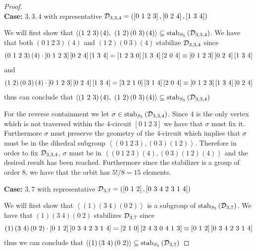\begin{proof}
  \label{pf:pcd_stab}
\ \\
\vspace{2ex}
\noindent
{\bf Case:} $3,3,4$ with representative $\operatorname{\mathcal{D}}_{3,3,4} = \left(\left[0\ 1\ 2\ 3   \right], \left[0\ 2\ 4 \right], \left[ 1\ 3\ 4 \right]\right)$ 
\vspace{2ex}

\noindent
We will first show that $\left<\left(1\ 2\ 3 \right)(4),\  \left(1\ 2\right)\left(0\ 3 \right)\left(4\right)\right> \subseteq \stab{S_5}{ \pcd_{3,3,4} }$. We have that both $ \left( 0\ 1\ 2\ 3 \right)\left(4\right)$ and $\left(1\ 2\right)\left(0\ 3\right)\left(4\right)$ stabilize $\operatorname{\mathcal{D}}_{3,3,4}$ since
\[ 
\acts{ \left( 0\ 1\ 2\ 3 \right)\left(4\right) }{\left[0\ 1\ 2\ 3 \right]  \left[0\ 2\ 4 \right] \left[ 1\ 3\ 4 \right]}  = \left[1\ 2\ 3\ 0 \right]\left[1\ 3\ 4 \right]\left[2\ 0\ 4 \right] \equiv \left[0\ 1\ 2\ 3 \right] \left[0\ 2\ 4\right] \left[ 1\ 3\ 4\right] 
\] and 
\[
\acts{\left(1\ 2\right)\left(0\ 3\right)\left(4\right)}{\left[0\ 1\ 2\ 3\right]\left[0\ 2\ 4\right]\left[1\ 3\ 4\right]}  = \left[3\ 2\ 1\ 0 \right]\left[3\ 1\ 4 \right]\left[2\ 0\ 4\right] \equiv \left[0\ 1\ 2\ 3 \right]\left[1\ 3\ 4 \right]\left[0\ 2\ 4 \right]
\] thus can conclude that $\left<\left(1\ 2\ 3 \right)(4),\  \left(1\ 2\right)\left(0\ 3 \right)\left(4\right)\right> \subseteq \stab{S_5}{ \pcd_{3,3,4} }$

For the reverse containment we let $\sigma \in \operatorname{\mathrm{stab}}_{S_5}\left(\operatorname{\mathcal{D}}_{3,3,4} \right)$. Since $4$ is the only vertex which is not traversed within the $4$-circuit $\left[0\ 1\ 2\ 3\right]$ we have that $\sigma$ must fix it. Furthermore $\sigma$ must preserve the geometry of the $4$-circuit which implies that $\sigma$ must be in the dihedral subgroup $\left< \left(0\ 1\ 2\ 3\right),\left(0\ 3\right)\left(1\ 2\right) \right>$. Therefore in order to fix $\operatorname{\mathcal{D}}_{3,3,4}$, $\sigma$ must be in $\left< \left( 0\ 1\ 2\ 3 \right)\left(4\right), \left(0\ 3 \right)\left(1\ 2\right)\left(4\right) \right>$ and the desired result has been reached. Furthermore since the stabilizer is a group of order $8$, we have that the orbit has $5!/8 = 15$ elements. 

\vspace{2ex}
\noindent
{\bf Case:} $3,7$ with representative $\operatorname{\mathcal{D}}_{3,7} = \left(\left[0\ 1\  2 \right],\left[0\ 3\ 4\ 2\ 3\ 1\ 4 \right]\right) $
\vspace{2ex}

\noindent
We will first show that $\left<\left(1 \right)\left(3\ 4\right)\left(0\ 2\right)\right>$ is a subgroup of $\operatorname{\mathrm{stab}}_{S_5}\left(\operatorname{\mathcal{D}}_{3,7} \right)$. We have that $\left(1 \right)\left(3\ 4\right)\left(0\ 2\right)$ stabilizes $\operatorname{\mathcal{D}}_{3,7}$ since
\[     
\acts{\left(1\right)\left(3\ 4\right)\left(0\ 2\right)}{ \left[0\ 1\ 2\right]\left[0\ 3\ 4\ 2\ 3\ 1\ 4\right]} = \left[2\ 1\ 0\right]\left[2\ 4\ 3\ 0\ 4\ 1\ 3\right] \equiv \left[0\ 1\ 2\right]\left[0\ 3\ 4\ 2\ 3\ 1\ 4\right]
\] thus we can conclude that $\left< \left(1\right)\left(3\ 4\right)\left(0\ 2\right)\right> \subseteq \stab{S_5}{\pcd_{3,7}}$


\end{proof}

